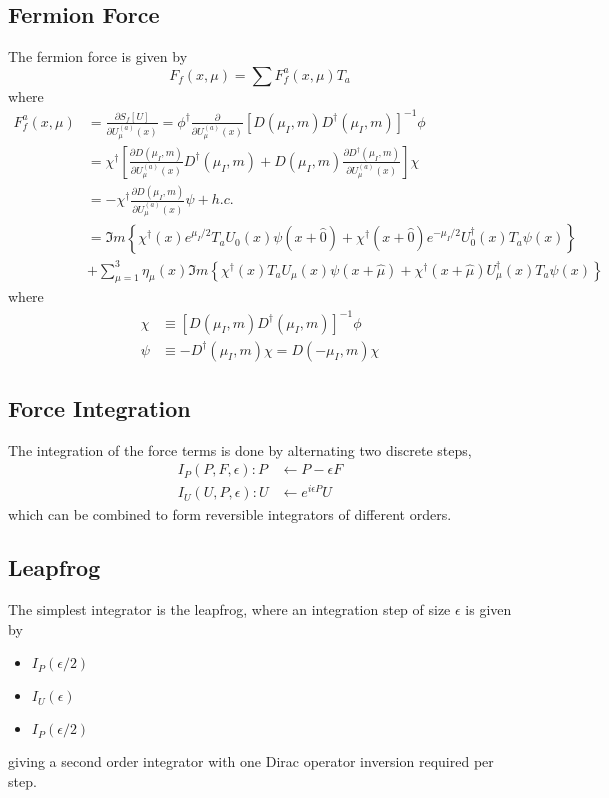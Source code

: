 \documentclass[a4paper,12pt]{article}
\begin{document}
\subsection{Fermion Force}
The fermion force is given by
\begin{equation}
F_f(x,\mu) = \sum F_f^a(x,\mu) T_a
\end{equation}
where
\begin{align}
F_f^a(x,\mu) &= \frac{\partial S_f[U]}{\partial U_{\mu}^{(a)}(x)} = \phi^{\dagger} \frac{\partial }{\partial U_{\mu}^{(a)}(x)} [D(\mu_I,m) D^{\dagger}(\mu_I,m)]^{-1} \phi \\
&= \chi^{\dagger} \left[ \frac{\partial D(\mu_I,m)}{\partial U_{\mu}^{(a)}(x)} D^{\dagger}(\mu_I,m) +  D(\mu_I,m) \frac{\partial D^{\dagger}(\mu_I,m)}{\partial U_{\mu}^{(a)}(x)}  \right] \chi \\
&= -\chi^{\dagger} \frac{\partial D(\mu_I,m)}{\partial U_{\mu}^{(a)}(x)} \psi + h.c. \\
&= \Im m \left\{ \chi^{\dagger}(x) e^{\mu_I/2} T_a U_0(x)\psi(x+\hat0) + \chi^{\dagger}(x+\hat0) e^{-\mu_I/2} U_0^{\dagger}(x) T_a \psi(x) \right\} \nonumber \\
&+ \sum_{\mu=1}^{3} \eta_\mu(x) \Im m \left\{ \chi^{\dagger}(x) T_a U_\mu(x)\psi(x+\hat\mu) + \chi^{\dagger}(x+\hat\mu) U_\mu^{\dagger}(x) T_a \psi(x) \right\}
\end{align}
where
\begin{align}
\chi &\equiv [D(\mu_I,m) D^{\dagger}(\mu_I,m)]^{-1} \phi \\
\psi &\equiv -D^{\dagger}(\mu_I,m) \chi = D(-\mu_I, m) \chi
\end{align}

\subsection{Force Integration}
The integration of the force terms is done by alternating two discrete steps,
\begin{align}
  I_P(P, F, \epsilon): P & \leftarrow P - \epsilon F \\
  I_U(U, P, \epsilon): U & \leftarrow e^{i \epsilon P} U
\end{align}
which can be combined to form reversible integrators of different orders.
\subsection{Leapfrog}
The simplest integrator is the leapfrog, where an integration step of size $\epsilon$ is given by
\begin{itemize}
 \item $I_P(\epsilon/2)$
 \item $I_U(\epsilon)$
 \item $I_P(\epsilon/2)$
\end{itemize}
giving a second order integrator with one Dirac operator inversion required per step.
\end{document}
